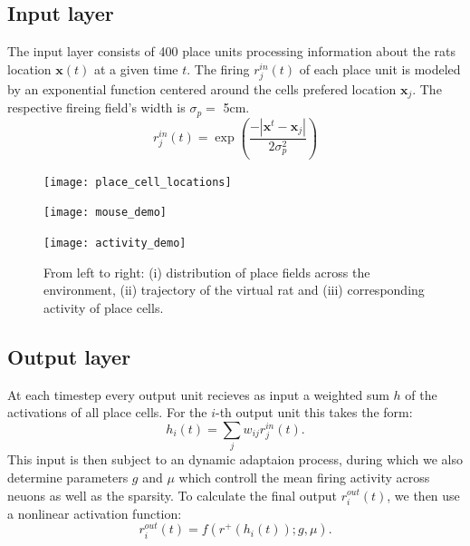 \documentclass[a4paper, 12pt]{article}
\begin{document}
\subsection{Input layer}
The input layer consists of 400 place units processing information about the rats location $\boldsymbol{x}(t)$ at a given time $t$. The firing $r_j^{in}(t)$ of each place unit is modeled by an exponential function centered around the cells prefered location $\boldsymbol{x}_j$. The respective fireing field's width is $\sigma_p=$ 5cm. 
	\begin{equation}
	r_j^{in}(t)=\exp\left(\frac{-|\boldsymbol{x}^t-\boldsymbol{x}_j|}{2\sigma_p^2}\right)
	\end{equation}
\begin{figure}[h]
\setlength{\abovecaptionskip}{5pt}
\setlength{\belowcaptionskip}{0pt}
\begin{minipage}[t]{0.3\textwidth}\vspace{0pt}
\texttt{[image: place\_cell\_locations]}
\end{minipage}\hfill%
\begin{minipage}[t]{0.3\textwidth}\vspace{0pt}
\texttt{[image: mouse\_demo]}
\end{minipage}\hfill
\begin{minipage}[t]{0.3\textwidth}\vspace{0pt}
\texttt{[image: activity\_demo]}
\end{minipage}
\caption{\footnotesize{From left to right: (i) distribution of place fields across the environment, (ii) trajectory of the virtual rat and (iii) corresponding activity of place cells.}}
\end{figure}
%
%
%	
\subsection{Output layer}
At each timestep every output unit recieves as input a weighted sum $h$ of the activations of all place cells. For the $i$-th output unit this takes the form: 
	\begin{equation}
	h_i(t)=\sum_jw_{ij}r_j^{in}(t).
	\end{equation}
This input is then subject to an dynamic adaptaion process, during which we also determine parameters $g$ and $\mu$ which controll the mean firing activity across neuons as well as the sparsity. To calculate the final output $r_i^{out}(t)$, we then use a nonlinear activation function:
	\begin{equation}
	r_i^{out}(t) = f(r^+(h_i(t)); g,\mu).
	\end{equation}
\end{document}
